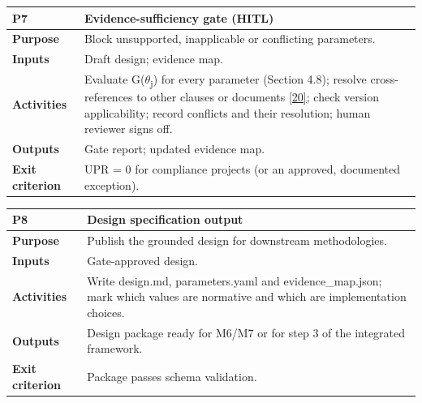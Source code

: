 \documentclass[11pt,a4paper]{article}
\begin{document}
\vspace{-2pt}
{\small
\begin{longtable}{>{\raggedright\arraybackslash}p{}>{\raggedright\arraybackslash}p{}}
\toprule
\rowcolor{headbg} \textbf{P7} & \textbf{Evidence-sufficiency gate (HITL)} \\
\midrule
\endfirsthead
\bottomrule
\endlastfoot
\textbf{Purpose} & Block unsupported, inapplicable or conflicting parameters. \\ \arrayrulecolor{rulec}\hline\arrayrulecolor{black}
\textbf{Inputs} & Draft design; evidence map. \\ \arrayrulecolor{rulec}\hline\arrayrulecolor{black}
\textbf{Activities} & Evaluate G(\ensuremath{\theta}\textsubscript{j}) for every parameter (Section 4.8); resolve cross-references to other clauses or documents \hyperlink{ref20}{[20]}; check version applicability; record conflicts and their resolution; human reviewer signs off. \\ \arrayrulecolor{rulec}\hline\arrayrulecolor{black}
\textbf{Outputs} & Gate report; updated evidence map. \\ \arrayrulecolor{rulec}\hline\arrayrulecolor{black}
\textbf{Exit criterion} & UPR = 0 for compliance projects (or an approved, documented exception). \\
\end{longtable}
}
\vspace{-2pt}
{\small
\begin{longtable}{>{\raggedright\arraybackslash}p{}>{\raggedright\arraybackslash}p{}}
\toprule
\rowcolor{headbg} \textbf{P8} & \textbf{Design specification output} \\
\midrule
\endfirsthead
\bottomrule
\endlastfoot
\textbf{Purpose} & Publish the grounded design for downstream methodologies. \\ \arrayrulecolor{rulec}\hline\arrayrulecolor{black}
\textbf{Inputs} & Gate-approved design. \\ \arrayrulecolor{rulec}\hline\arrayrulecolor{black}
\textbf{Activities} & Write design.md, parameters.yaml and evidence\_map.json; mark which values are normative and which are implementation choices. \\ \arrayrulecolor{rulec}\hline\arrayrulecolor{black}
\textbf{Outputs} & Design package ready for M6/M7 or for step 3 of the integrated framework. \\ \arrayrulecolor{rulec}\hline\arrayrulecolor{black}
\textbf{Exit criterion} & Package passes schema validation. \\
\end{longtable}
}
\end{document}
